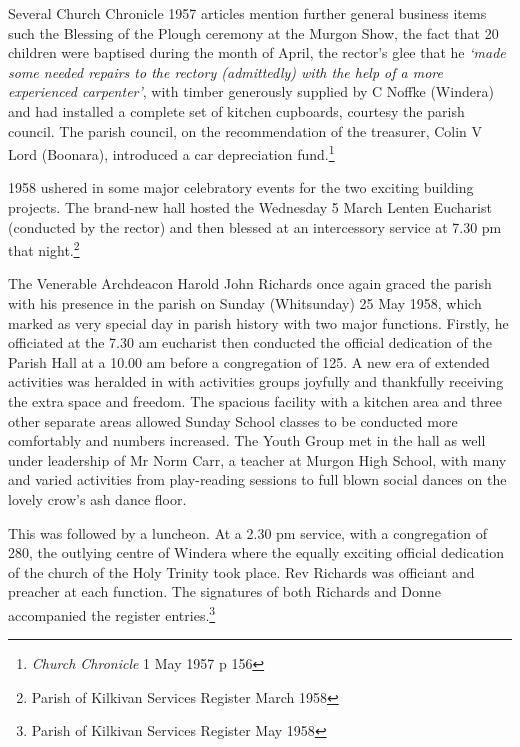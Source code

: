 Several Church Chronicle 1957 articles mention further general business items such the Blessing of the Plough ceremony at the Murgon Show, the fact that 20 children were baptised during the month of April, the rector's glee that he \emph{`made some needed repairs to the rectory (admittedly) with the help of a more experienced carpenter'}, with timber generously supplied by C Noffke (Windera) and had installed a complete set of kitchen cupboards, courtesy the parish council. The parish council, on the recommendation of the treasurer, Colin V Lord (Boonara), introduced a car depreciation fund.\footnote{\emph{Church Chronicle} 1 May 1957 p 156}

1958 ushered in some major celebratory events for the two exciting building projects. The brand-new hall hosted the Wednesday 5 March Lenten Eucharist (conducted by the rector) and then blessed at an intercessory service at 7.30 pm that night.\footnote{Parish of Kilkivan Services Register March 1958}

The Venerable Archdeacon Harold John Richards once again graced the parish with his presence in the parish on Sunday (Whitsunday) 25 May 1958, which marked as very special day in parish history with two major functions. Firstly, he officiated at the 7.30 am eucharist then conducted the official dedication of the Parish Hall at a 10.00 am before a congregation of 125. A new era of extended activities was heralded in with activities groups joyfully and thankfully receiving the extra space and freedom. The spacious facility with a kitchen area and three other separate areas allowed Sunday School classes to be conducted more comfortably and numbers increased. The Youth Group met in the hall as well under leadership of Mr Norm Carr, a teacher at Murgon High School, with many and varied activities from play-reading sessions to full blown social dances on the lovely crow's ash dance floor.

This was followed by a luncheon. At a 2.30 pm service, with a congregation of 280, the outlying centre of Windera where the equally exciting official dedication of the church of the Holy Trinity took place. Rev Richards was officiant and preacher at each function. The signatures of both Richards and Donne accompanied the register entries.\footnote{Parish of Kilkivan Services Register May 1958}

